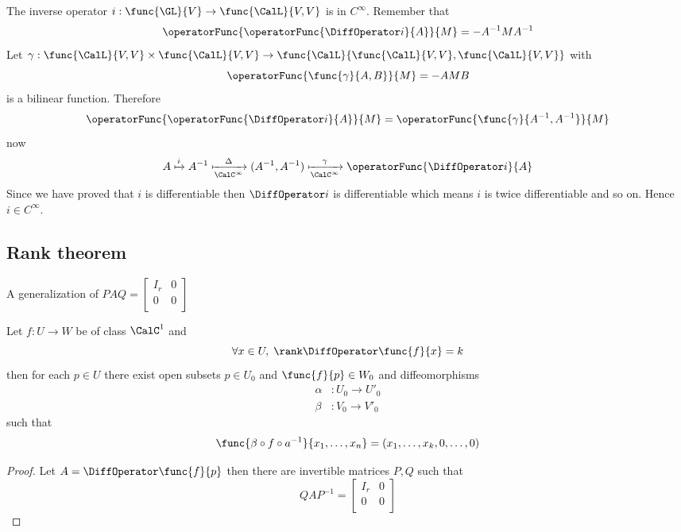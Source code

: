 \begin{example}
    The inverse operator \(i : \func{\GL}{V} \to \func{\CalL}{V,V}\) is in \(C^\infty\). Remember that
    \begin{equation*}
        \operatorFunc{\operatorFunc{\DiffOperator i}{A}}{M} = - A^{-1}M A^{-1}
    \end{equation*}
    Let \(\gamma : \func{\CalL}{V,V} \times \func{\CalL}{V,V} \to \func{\CalL}{\func{\CalL}{V,V} , \func{\CalL}{V,V}}\) with
    \begin{equation*}
        \operatorFunc{\func{\gamma}{A,B}}{M} = - AMB
    \end{equation*}
    is a bilinear function. Therefore
    \begin{equation*}
        \operatorFunc{\operatorFunc{\DiffOperator i}{A}}{M} = \operatorFunc{\func{\gamma}{A^{-1},A^{-1}}}{M}
    \end{equation*}
    now
    \begin{equation*}
        A \xmapsto{i} A^{-1} \xmapsto[\CalC^\infty]{\Delta} (A^{-1}, A^{-1}) \xmapsto[\CalC^\infty]{\gamma} \operatorFunc{\DiffOperator i}{A}
    \end{equation*}
    Since we have proved that \(i\) is differentiable then \(\DiffOperator i\) is differentiable which means \(i\) is twice differentiable and so on. Hence \(i \in C^{\infty}\).
\end{example}

\subsection{Rank theorem}
A generalization of \(PAQ = \begin{bmatrix}
    I_r & 0 \\
    0   & 0 \\
\end{bmatrix}\)
\begin{theorem}
    Let \(f: U \to W\) be of class \(\CalC^1\) and
    \begin{equation*}
        \forall x \in U, \; \rank \DiffOperator \func{f}{x} = k
    \end{equation*}
    then for each \(p \in U\) there exist open subsets \(p \in U_0\) and \(\func{f}{p} \in W_0\) and diffeomorphisms
    \begin{align*}
        \alpha & : U_0 \to U'_0 \\
        \beta  & : V_0 \to V'_0
    \end{align*}
    such that
    \begin{equation*}
        \func{ \beta \circ f \circ a^{-1} }{x_1, \dots, x_n} = (x_1, \dots , x_k, 0 , \dots, 0)
    \end{equation*}
\end{theorem}

\begin{proof}
    Let \(A = \DiffOperator \func{f}{p}\) then there are invertible matrices \(P,Q\) such that
    \begin{equation*}
        Q A P^{-1} = \begin{bmatrix}
            I_r & 0 \\
            0   & 0 \\
        \end{bmatrix}
    \end{equation*}
\end{proof}